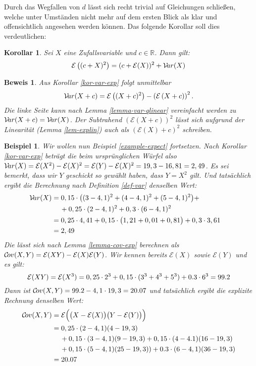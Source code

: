 \documentclass[a4paper]{article}
\newtheorem{korollar}[satz]{Korollar}
\newtheorem{beispiel}[satz]{Beispiel}
\theoremstyle{nonumberplain}
\newtheorem{beweis}{Beweis}
\begin{document}
	
	Durch das Wegfallen von $d$ lässt sich recht trivial auf Gleichungen schließen, welche unter Umständen nicht mehr auf dem ersten Blick als klar und offensichtlich angesehen werden können. Das folgende Korollar soll dies verdeutlichen:
	\begin{korollar}
		Sei $X$ eine Zufallsvariable und $c \in \mathbb{R}$. Dann gilt:
		\begin{equation}
		\mathcal{E}\left((c+X)^2\right) = (c+ \mathcal{E}(X))^2 + \mathcal{V}\!ar(X)
		\end{equation}
	\end{korollar}
	\begin{beweis}
		Aus Korollar \ref{kor-var-exp} folgt unmittelbar \[\mathcal{V}\!ar(X+c) = \mathcal{E}\left((X+c)^{2}\right) - \left(\mathcal{E}\left(X+c\right)\right)^{2}\text{.}\] Die linke Seite kann nach Lemma \ref{lemma-var-qlinear} vereinfacht werden zu $\mathcal{V}\!ar(X+c) = \mathcal{V}\!ar(X)$. Der Subtrahend $\left(\mathcal{E}\left(X+c\right)\right)^{2}$ lässt sich aufgrund der Linearität (Lemma \ref{lem-explin}) auch als $\left( \mathcal{E}(X)+c\right)^{2}$ 
		schreiben.
	\end{beweis}
	
	\begin{beispiel}
		Wir wollen nun Beispiel \ref{example-expect} fortsetzen. 
		Nach Korollar \ref{kor-var-exp} beträgt die \var{} beim ursprünglichen Würfel also $\mathcal{V}\!ar(X) = \mathcal{E}(X^2) - \mathcal{E}(X)^2 = \mathcal{E}(Y) - \mathcal{E}(X)^2 = 19,3 - 16,81 = 2,49$. Es sei bemerkt, dass wir $Y$ geschickt so gewählt haben, dass $Y = X^2$ gilt. Und tatsächlich ergibt die Berechnung nach Definition \ref{def-var} denselben Wert:
		\begin{align*}
		\mathcal{V}\!ar(X) & = 0,15 \cdot \big((3- 4,1)^2 + (4-4,1)^2 + (5-4,1)^2\big) + && \\
		& \hspace{1.2em} + 0,25 \cdot (2 - 4,1)^2 + 0,3 \cdot (6-4,1)^2 && \\
		& = 0,25 \cdot 4,41 + 0,15 \cdot \big(1,21 + 0,01 + 0,81\big) + 0,3 \cdot 3,61 && \\
		& = 2,49 &&
		\end{align*}
		Die \cov{} lässt sich nach Lemma \ref{lemma-cov-exp} berechnen als $\mathcal{C}\!ov(X,Y) = \mathcal{E}(XY) - \mathcal{E}(X)\mathcal{E}(Y)$.
		Wir kennen bereits $\mathcal{E}(X)$ sowie $\mathcal{E}(Y)$ und es gilt:
		\[
		\mathcal{E}(XY) = \mathcal{E}(X^3) = 0,25 \cdot 2^3 + 0,15 \cdot (3^3 + 4^3 + 5^3) + 0.3 \cdot 6^3 = 99.2
		\]
		Dann ist  $\mathcal{C}\!ov(X,Y) = 99.2 - 4,1 \cdot 19,3 = 20.07$ und tatsächlich ergibt die explizite Rechnung denselben Wert:
		\begin{align*}
		\mathcal{C}\!ov(X,Y) &= \mathcal{E} \Big( \big(X - \mathcal{E}(X)\big)\big(Y - \mathcal{E}(Y) \big)\Big) \\
		&= 0,25 \cdot (2-4,1)(4-19,3) \\
		& \hspace{1.2em} + 0,15 \cdot (3-4,1)(9-19,3) + 0,15 \cdot (4-4.1)(16-19,3) \\
		& \hspace{1.2em} +  0,15 \cdot (5-4,1)(25-19,3)) + 0.3 \cdot (6-4,1)(36-19,3) \\
		&= 20.07
		\end{align*}
	\end{beispiel}
	
\end{document}
